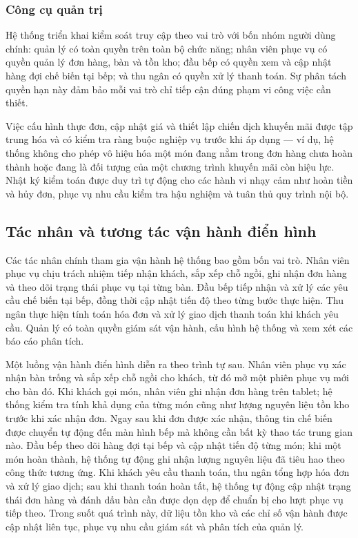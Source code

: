 \subsubsection{Công cụ quản trị}

Hệ thống triển khai kiểm soát truy cập theo vai trò với bốn nhóm người dùng chính: quản lý có toàn quyền trên toàn bộ chức năng; nhân viên phục vụ có quyền quản lý đơn hàng, bàn và tồn kho; đầu bếp có quyền xem và cập nhật hàng đợi chế biến tại bếp; và thu ngân có quyền xử lý thanh toán. Sự phân tách quyền hạn này đảm bảo mỗi vai trò chỉ tiếp cận đúng phạm vi công việc cần thiết.

Việc cấu hình thực đơn, cập nhật giá và thiết lập chiến dịch khuyến mãi được tập trung hóa và có kiểm tra ràng buộc nghiệp vụ trước khi áp dụng — ví dụ, hệ thống không cho phép vô hiệu hóa một món đang nằm trong đơn hàng chưa hoàn thành hoặc đang là đối tượng của một chương trình khuyến mãi còn hiệu lực. Nhật ký kiểm toán được duy trì tự động cho các hành vi nhạy cảm như hoàn tiền và hủy đơn, phục vụ nhu cầu kiểm tra hậu nghiệm và tuân thủ quy trình nội bộ.
 
\subsection{Tác nhân và tương tác vận hành điển hình}

Các tác nhân chính tham gia vận hành hệ thống bao gồm bốn vai trò. Nhân viên phục vụ chịu trách nhiệm tiếp nhận khách, sắp xếp chỗ ngồi, ghi nhận đơn hàng và theo dõi trạng thái phục vụ tại từng bàn. Đầu bếp tiếp nhận và xử lý các yêu cầu chế biến tại bếp, đồng thời cập nhật tiến độ theo từng bước thực hiện. Thu ngân thực hiện tính toán hóa đơn và xử lý giao dịch thanh toán khi khách yêu cầu. Quản lý có toàn quyền giám sát vận hành, cấu hình hệ thống và xem xét các báo cáo phân tích.

Một luồng vận hành điển hình diễn ra theo trình tự sau. Nhân viên phục vụ xác nhận bàn trống và sắp xếp chỗ ngồi cho khách, từ đó mở một phiên phục vụ mới cho bàn đó. Khi khách gọi món, nhân viên ghi nhận đơn hàng trên tablet; hệ thống kiểm tra tính khả dụng của từng món cũng như lượng nguyên liệu tồn kho trước khi xác nhận đơn. Ngay sau khi đơn được xác nhận, thông tin chế biến được chuyển tự động đến màn hình bếp mà không cần bất kỳ thao tác trung gian nào. Đầu bếp theo dõi hàng đợi tại bếp và cập nhật tiến độ từng món; khi một món hoàn thành, hệ thống tự động ghi nhận lượng nguyên liệu đã tiêu hao theo công thức tương ứng. Khi khách yêu cầu thanh toán, thu ngân tổng hợp hóa đơn và xử lý giao dịch; sau khi thanh toán hoàn tất, hệ thống tự động cập nhật trạng thái đơn hàng và đánh dấu bàn cần được dọn dẹp để chuẩn bị cho lượt phục vụ tiếp theo. Trong suốt quá trình này, dữ liệu tồn kho và các chỉ số vận hành được cập nhật liên tục, phục vụ nhu cầu giám sát và phân tích của quản lý.
